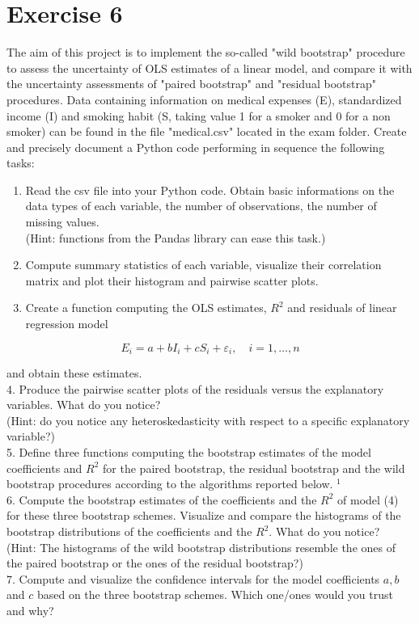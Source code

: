 \section{Exercise 6}
\label{sec:sec6}
The aim of this project is to implement the so-called "wild bootstrap" procedure to assess the uncertainty of OLS estimates of a linear model, and compare it with the uncertainty assessments of "paired bootstrap" and "residual bootstrap" procedures. Data containing information on medical expenses (E), standardized income (I) and smoking habit (S, taking value 1 for a smoker and 0 for a non smoker) can be found in the file "medical.csv" located in the exam folder. Create and precisely document a Python code performing in sequence the following tasks:

\begin{enumerate}
  \item Read the csv file into your Python code. Obtain basic informations on the data types of each variable, the number of observations, the number of missing values.\\
(Hint: functions from the Pandas library can ease this task.)
  \item Compute summary statistics of each variable, visualize their correlation matrix and plot their histogram and pairwise scatter plots.
  \item Create a function computing the OLS estimates, $R^{2}$ and residuals of linear regression model
\end{enumerate}


\begin{equation}
E_{i}=a+b I_{i}+c S_{i}+\varepsilon_{i}, \quad i=1, \ldots, n \label{eq:Ei}
\end{equation}


and obtain these estimates.\\
4. Produce the pairwise scatter plots of the residuals versus the explanatory variables. What do you notice?\\
(Hint: do you notice any heteroskedasticity with respect to a specific explanatory variable?)\\
5. Define three functions computing the bootstrap estimates of the model coefficients and $R^{2}$ for the paired bootstrap, the residual bootstrap and the wild bootstrap procedures according to the algorithms reported below. ${ }^{1}$\\
6. Compute the bootstrap estimates of the coefficients and the $R^{2}$ of model (4) for these three bootstrap schemes. Visualize and compare the histograms of the bootstrap distributions of the coefficients and the $R^{2}$. What do you notice?\\
(Hint: The histograms of the wild bootstrap distributions resemble the ones of the paired bootstrap or the ones of the residual bootstrap?)\\
7. Compute and visualize the confidence intervals for the model coefficients $a, b$ and $c$ based on the three bootstrap schemes. Which one/ones would you trust and why?

